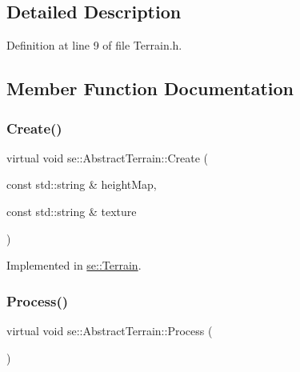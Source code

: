 \subsection{Detailed Description}


Definition at line 9 of file Terrain.\+h.



\subsection{Member Function Documentation}
\mbox{\label{classse_1_1_abstract_terrain_ac8254489e68bcfc1960b968afeb683b0}} 
\subsubsection{\texorpdfstring{Create()}{Create()}}
{\footnotesize\ttfamily virtual void se\+::\+Abstract\+Terrain\+::\+Create (\begin{DoxyParamCaption}\item[{const std\+::string \&}]{height\+Map,  }\item[{const std\+::string \&}]{texture }\end{DoxyParamCaption})\hspace{0.3cm}{\ttfamily [pure virtual]}}



Implemented in \mbox{\hyperlink{classse_1_1_terrain_aa4faf6049af59a776a2464175e62ff08}{se\+::\+Terrain}}.

\mbox{\label{classse_1_1_abstract_terrain_af2f0249eead2b62a82baa2ecbb52efeb}} 
\subsubsection{\texorpdfstring{Process()}{Process()}}
{\footnotesize\ttfamily virtual void se\+::\+Abstract\+Terrain\+::\+Process (\begin{DoxyParamCaption}{ }\end{DoxyParamCaption})\hspace{0.3cm}{\ttfamily [pure virtual]}}



